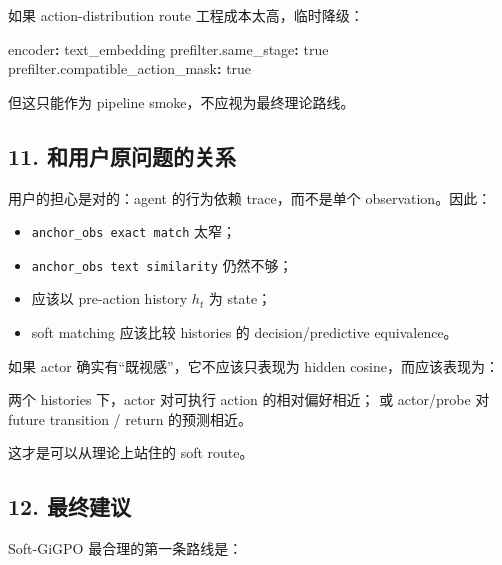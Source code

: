 \documentclass[
  10pt,
]{ctexart}
\newenvironment{Shaded}{}{}
\newcommand{\AttributeTok}[1]{\textcolor[rgb]{0.49,0.56,0.16}{#1}}
\newcommand{\CharTok}[1]{\textcolor[rgb]{0.25,0.44,0.63}{#1}}
\newcommand{\FunctionTok}[1]{\textcolor[rgb]{0.02,0.16,0.49}{#1}}
\newcommand{\KeywordTok}[1]{\textcolor[rgb]{0.00,0.44,0.13}{\textbf{#1}}}
\newcommand{\NormalTok}[1]{#1}
\providecommand{\tightlist}{%
  \setlength{\itemsep}{0pt}\setlength{\parskip}{0pt}}
\begin{document}
如果 action-distribution route 工程成本太高，临时降级：

\begin{Shaded}
\begin{Highlighting}[]
\FunctionTok{encoder}\KeywordTok{:}\AttributeTok{ text\_embedding}
\FunctionTok{prefilter.same\_stage}\KeywordTok{:}\AttributeTok{ }\CharTok{true}
\FunctionTok{prefilter.compatible\_action\_mask}\KeywordTok{:}\AttributeTok{ }\CharTok{true}
\end{Highlighting}
\end{Shaded}

但这只能作为 pipeline smoke，不应视为最终理论路线。

\subsection{11.
和用户原问题的关系}\label{ux548cux7528ux6237ux539fux95eeux9898ux7684ux5173ux7cfb}

用户的担心是对的：agent 的行为依赖 trace，而不是单个 observation。因此：

\begin{itemize}
\tightlist
\item
  \texttt{anchor\_obs\ exact\ match} 太窄；
\item
  \texttt{anchor\_obs\ text\ similarity} 仍然不够；
\item
  应该以 pre-action history \(h_t\) 为 state；
\item
  soft matching 应该比较 histories 的 decision/predictive equivalence。
\end{itemize}

如果 actor 确实有``既视感''，它不应该只表现为 hidden
cosine，而应该表现为：

\begin{Shaded}
\begin{Highlighting}[]
\NormalTok{两个 histories 下，actor 对可执行 action 的相对偏好相近；}
\NormalTok{或 actor/probe 对 future transition / return 的预测相近。}
\end{Highlighting}
\end{Shaded}

这才是可以从理论上站住的 soft route。

\subsection{12. 最终建议}\label{ux6700ux7ec8ux5efaux8bae}

Soft-GiGPO 最合理的第一条路线是：
\end{document}
